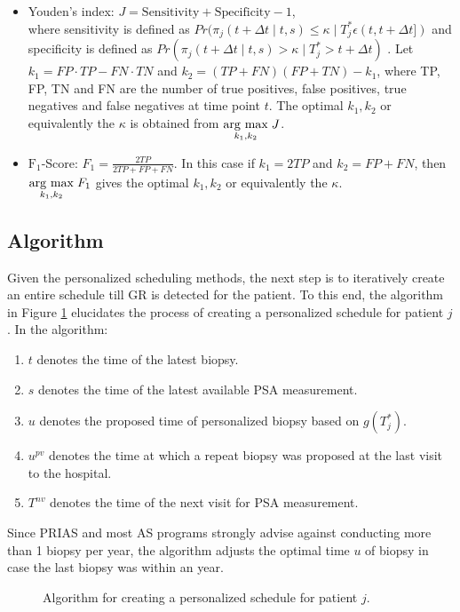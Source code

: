 \begin{itemize}

\item Youden's index: $J = \text{Sensitivity} + \text{Specificity}- 1$,\\
where sensitivity is defined as $Pr(\pi_j(t + \Delta t \mid t,s) \leq \kappa \mid T^*_j \epsilon (t, t + \Delta t])$ and specificity is defined as $Pr(\pi_j(t + \Delta t \mid t,s) > \kappa \mid T^*_j > t + \Delta t)$ \citep{rizopoulosJMbayes}. Let $k_1 = FP \cdot TP - FN \cdot TN$ and $k_2 = (TP+FN)(FP+TN) - k_1$, where TP, FP, TN and FN are the number of true positives, false positives, true negatives and false negatives at time point $t$. The optimal $k_1, k_2$ or equivalently the $\kappa$ is obtained from $\underset{k_1, k_2}{\operatorname{arg}\,\operatorname{max}}\; J$.

\item $\text{F}_1$-Score: $F_1 = \frac{2TP}{2TP + FP + FN}$. In this case if $k_1 = 2TP$ and $k_2 = FP + FN$, then $\underset{k_1, k_2}{\operatorname{arg}\,\operatorname{max}}\; F _1$ gives the optimal $k_1, k_2$ or equivalently the $\kappa$.
\end{itemize}

\subsection{Algorithm}
\label{subsec : pers_sched_algorithm}
Given the personalized scheduling methods, the next step is to iteratively create an entire schedule till GR is detected for the patient. To this end, the algorithm in Figure \ref{fig : sched_algorithm} elucidates the process of creating a personalized schedule for patient $j$. In the algorithm:

\begin{enumerate}
\item $t$ denotes the time of the latest biopsy.
\item $s$ denotes the time of the latest available PSA measurement.
\item $u$ denotes the proposed time of personalized biopsy based on $g(T^*_j)$.
\item $u^{pv}$ denotes the time at which a repeat biopsy was proposed at the last visit to the hospital.
\item $T^{nv}$ denotes the time of the next visit for PSA measurement.
\end{enumerate}
Since PRIAS and most AS programs strongly advise against conducting more than 1 biopsy per year, the algorithm adjusts the optimal time $u$ of biopsy in case the last biopsy was within an year.

\begin{figure}
\centering
\captionsetup{justification=centering}

\caption{Algorithm for creating a personalized schedule for patient $j$.} 
\label{fig : sched_algorithm}
\end{figure}